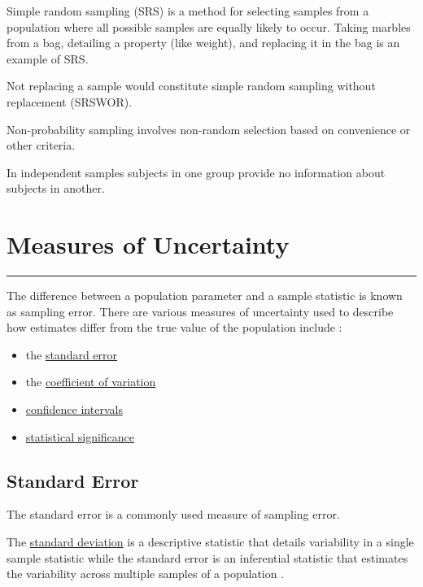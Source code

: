 \documentclass[
]{book}
\begin{document}
Simple random sampling (SRS) is a method for selecting samples from a population where all possible samples are equally likely to occur. Taking marbles from a bag, detailing a property (like weight), and replacing it in the bag is an example of SRS.

Not replacing a sample would constitute simple random sampling without replacement (SRSWOR).

Non-probability sampling involves non-random selection based on convenience or other criteria.

In independent samples subjects in one group provide no information about subjects in another.

\hypertarget{error}{%
\chapter{Measures of Uncertainty}\label{error}}

\begin{center}\rule{0.5\linewidth}{0.5pt}\end{center}

The difference between a population parameter and a sample statistic is known as sampling error. There are various measures of uncertainty used to describe how estimates differ from the true value of the population include \citep{uncertainty}:

\begin{itemize}
\item
  the \protect\hyperlink{stderr}{standard error}
\item
  the \protect\hyperlink{coeff}{coefficient of variation}
\item
  \protect\hyperlink{confint}{confidence intervals}
\item
  \protect\hyperlink{signif}{statistical significance}
\end{itemize}

\hypertarget{stderr}{%
\section{Standard Error}\label{stderr}}

The standard error is a commonly used measure of sampling error.

The \protect\hyperlink{stdv}{standard deviation} is a descriptive statistic that details variability in a single sample statistic while the standard error is an inferential statistic that estimates the variability across multiple samples of a population \citep{lee}.
\end{document}
